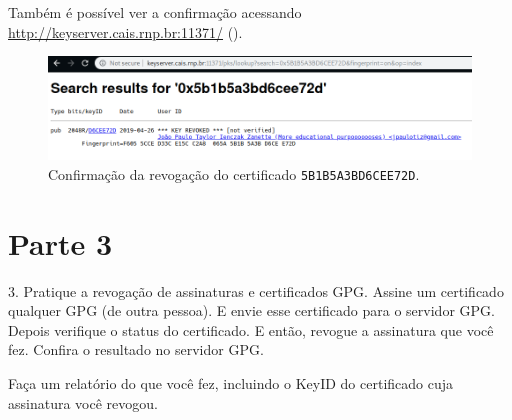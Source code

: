 \documentclass{article}
\begin{document}
    Também é possível ver a confirmação acessando
    \url{http://keyserver.cais.rnp.br:11371/} ().

    \begin{figure}[ht]
        \centering
        \includegraphics[keepaspectratio,width=1\textwidth]{revoked-keyserver.png}
        \caption{%
            Confirmação da revogação do certificado
            \texttt{5B1B5A3BD6CEE72D}.\label{fig:revokee}
        }
    \end{figure}

    \section{Parte 3}

    \begin{superframe}
        3. Pratique a revogação de assinaturas e certificados GPG\@. Assine um
        certificado qualquer GPG (de outra pessoa). E envie esse certificado
        para o servidor GPG\@. Depois verifique o status do certificado. E
        então, revogue a assinatura que você fez. Confira o resultado no
        servidor GPG\@.

        \begin{todolist}
            \item Faça um relatório do que você fez, incluindo o KeyID do
                certificado cuja assinatura você revogou.
        \end{todolist}
    \end{superframe}
\end{document}
